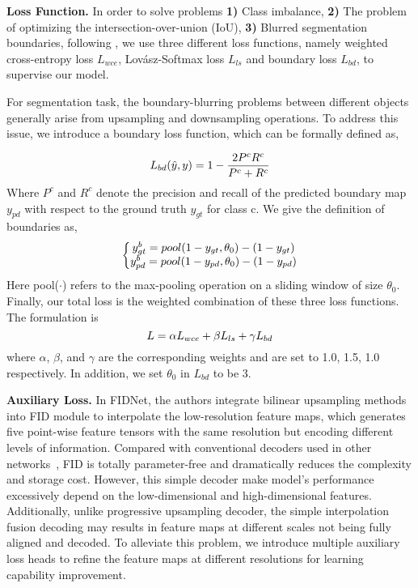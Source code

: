\documentclass{article}
\begin{document}
\noindent\textbf{Loss Function.} In order to solve problems \textbf{1)} Class imbalance, \textbf{2)} The problem of optimizing the intersection-over-union (IoU), \textbf{3)} Blurred segmentation boundaries, following  \cite{Lite-HDSeg}, we use three different loss functions, namely weighted cross-entropy loss $L_{wce}$, Lovász-Softmax loss $L_{ls}$ and boundary loss $L_{bd}$, to supervise our model.

For segmentation task, the boundary-blurring problems between different objects generally arise from upsampling and downsampling operations. To address this issue, we introduce a boundary loss function, which can be formally defined as, 

\vspace{-1ex}
\begin{equation}
L_{bd}(\hat{y}, y) = 1-\frac{2P^{c}R^{c}}{P^{c} + R^{c}}
\vspace{-1ex}
\end{equation}
Where $P^c$ and $R^c$ denote the precision and recall of the predicted boundary map $y_{pd}$ with respect to the ground truth $y_{gt}$ for class c. We give the definition of boundaries as,
\vspace{-1ex}
\begin{equation}
\left\{\begin{matrix}
	y_{gt}^{b}=pool(1-y_{gt},\theta _{0})-(1-y_{gt})
	\\ 
	y_{pd}^{b}=pool(1-y_{pd},\theta _{0})-(1-y_{pd})
\end{matrix}\right.
\vspace{-1ex}
\end{equation}
Here pool($\cdot$) refers to the max-pooling operation on a sliding window of size $\theta_0$. Finally, our total loss is the weighted combination of these three loss functions. The formulation is 
\vspace{-1ex}
\begin{equation}
\label{eq: loss}
L = \alpha L_{wce} + \beta L_{ls} + \gamma L_{bd}
\vspace{-1ex}
\end{equation}
where $\alpha$, $\beta$, and $\gamma$ are the corresponding weights and are set to 1.0, 1.5, 1.0 respectively. In addition, we set $\theta_0$ in $L_{bd}$ to be 3.

\noindent\textbf{Auxiliary Loss.} In FIDNet, the authors integrate bilinear upsampling methods into FID module to interpolate the low-resolution feature maps, which generates five point-wise feature tensors with the same resolution but encoding different levels of information.  Compared with conventional decoders used in other networks~\cite{cortinhal2020salsanext,Lite-HDSeg, kochanov2020kprnet}, FID is totally parameter-free and dramatically reduces the complexity and storage cost. However, this simple decoder make model's performance excessively depend on the low-dimensional and high-dimensional features. Additionally, unlike progressive upsampling decoder, the simple interpolation fusion decoding may results in feature maps at different scales not being fully aligned and decoded. To alleviate this problem, we introduce multiple auxiliary loss heads to refine the feature maps at different resolutions for learning capability improvement.
\end{document}

